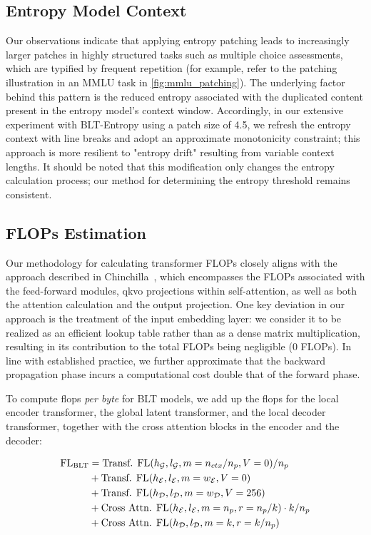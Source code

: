 \subsection{Entropy Model Context}
\label{section:entropy-context}
Our observations indicate that applying entropy patching leads to increasingly larger patches in highly structured tasks such as multiple choice assessments, which are typified by frequent repetition (for example, refer to the patching illustration in an MMLU task in \autoref{fig:mmlu_patching}). The underlying factor behind this pattern is the reduced entropy associated with the duplicated content present in the entropy model's context window. Accordingly, in our extensive experiment with {\textsc BLT}-Entropy using a patch size of 4.5, we refresh the entropy context with line breaks and adopt an approximate monotonicity constraint; this approach is more resilient to "entropy drift" resulting from variable context lengths. It should be noted that this modification only changes the entropy calculation process; our method for determining the entropy threshold remains consistent.

\subsection{FLOPs Estimation} 
\label{section:flops}

Our methodology for calculating transformer FLOPs closely aligns with the approach described in Chinchilla~\citep{hoffmann2022training}, which encompasses the FLOPs associated with the feed-forward modules, qkvo projections within self-attention, as well as both the attention calculation and the output projection. One key deviation in our approach is the treatment of the input embedding layer: we consider it to be realized as an efficient lookup table rather than as a dense matrix multiplication, resulting in its contribution to the total FLOPs being negligible (0 FLOPs). In line with established practice, we further approximate that the backward propagation phase incurs a computational cost double that of the forward phase.

To compute flops \textit{per byte} for {\textsc BLT} models, we add up the flops for the local encoder transformer, the global latent transformer, and the local decoder transformer, together with the cross attention blocks in the encoder and the decoder:

\begin{align}
    \text{FL}_{\text{{\textsc BLT}}} &= \text{Transf. FL}(h_{\mathcal{G}}, l_{\mathcal{G}}, m=n_{ctx}/n_p,V=0) / n_p\\
   &+\text{Transf. FL}(h_{\mathcal{E}}, l_{\mathcal{E}}, m=w_{\mathcal{E}}, V=0) \\
   &+ \text{Transf. FL}(h_{\mathcal{D}}, l_{\mathcal{D}}, m=w_{\mathcal{D}}, V=256) \\ 
    &+ \text{Cross Attn. FL}(h_{\mathcal{E}}, l_{\mathcal{E}}, m=n_p, r=n_p/k) \cdot k/n_p \\ 
   &+ \text{Cross Attn. FL}(h_{\mathcal{D}}, l_{\mathcal{D}}, m=k, r=k/n_p) 
\end{align}

